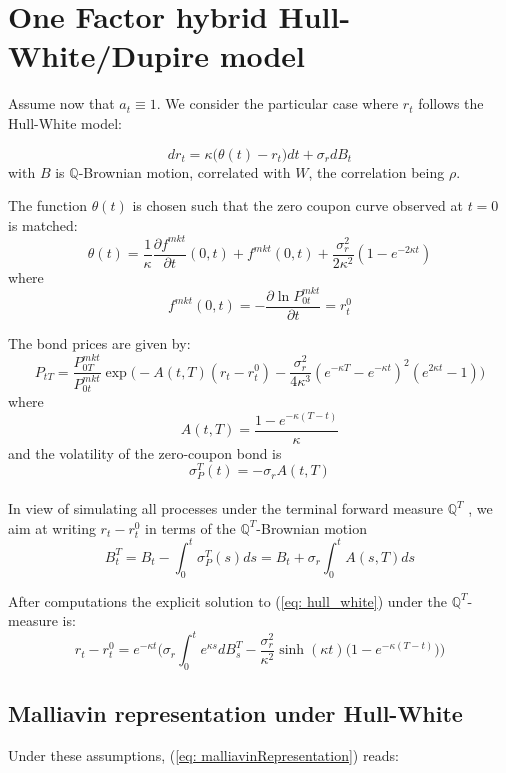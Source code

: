 \section{One Factor hybrid Hull-White/Dupire model}
Assume now that $a_t \equiv 1$. We consider the particular case where $r_t$ follows the Hull-White model:

\begin{equation}\label{eq: hull_white}
dr_t = \kappa\big(\theta(t)-r_t\big)dt+\sigma_r dB_t
\end{equation}
with $B$ is $\mathbb{Q}$-Brownian motion, correlated with $W$, the correlation being $\rho$.

The function $ \theta(t)$ is chosen such that the zero coupon curve observed at $t = 0$ is matched:
$$\theta(t) = \frac{1}{\kappa}\frac{\partial f^{mkt}}{\partial t}(0,t)+f^{mkt}(0,t)+\frac{\sigma_r^2}{2\kappa^2}(1-e^{-2\kappa t})  $$
where
$$f^{mkt}(0,t)=-\frac{\partial\ln P_{0t}^{mkt}}{\partial t} = r_t^0$$

The bond prices are given by:
\begin{equation}\label{eq: bondPrice_hullWhite}
P_{tT}= \frac{P_{0T}^{mkt}}{P_{0t}^{mkt}}\exp\bigg( -A(t,T)(r_t-r_t^0)-\frac{\sigma_r^2}{4\kappa^3}(e^{-\kappa T}-e^{-\kappa t})^2(e^{2\kappa t}-1)     \bigg)
\end{equation}
where
$$A(t,T)= \frac{1-e^{ -\kappa(T-t) }}{\kappa}$$
and the volatility of the zero-coupon bond is 
$$\sigma_P^T(t)=-\sigma_r A(t,T)$$\\

In view of simulating all processes under the terminal forward measure $\mathbb{Q}^T$ ,
we aim at writing $r_t -r_t^0$ in terms of the $\mathbb{Q}^T$-Brownian motion
$$ B^T_t=B_t-\int_0^t\sigma_P^T(s)ds=B_t+\sigma_r\int_0^tA(s,T)ds $$

After computations the explicit solution to (\ref{eq: hull_white}) under the $\mathbb{Q}^T$-measure is:
\begin{equation}\label{eq: hullWhiteSolution}
r_t -r_t^0= e^{-\kappa t}\bigg(\sigma_r\int_0^t e^{\kappa s}dB_s^T-\frac{\sigma_r^2}{\kappa^2}\sinh(\kappa t)\big(1-e^{-\kappa(T-t)} \big)   \bigg)
\end{equation}

\subsection{Malliavin representation under Hull-White}\label{subsec: malliavin1F}
Under these assumptions, (\ref{eq: malliavinRepresentation}) reads:

